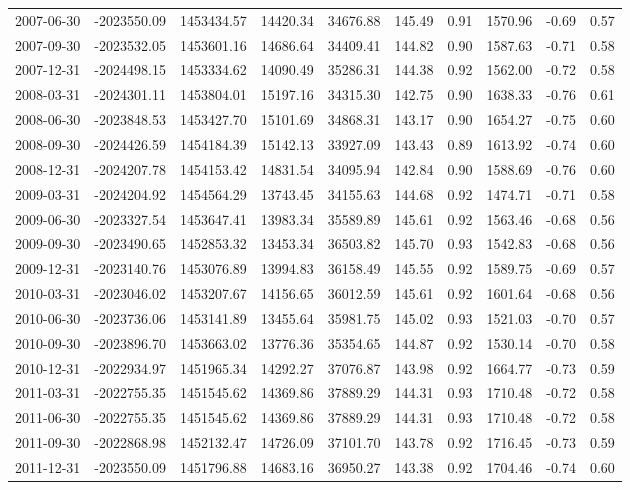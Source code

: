\begin{landscape}
\begin{longtable}{llllllllll}
2007-06-30 & -2023550.09 & 1453434.57 & 14420.34 & 34676.88 & 145.49 & 0.91 & 1570.96 & -0.69 & 0.57 \\
2007-09-30 & -2023532.05 & 1453601.16 & 14686.64 & 34409.41 & 144.82 & 0.90 & 1587.63 & -0.71 & 0.58 \\
2007-12-31 & -2024498.15 & 1453334.62 & 14090.49 & 35286.31 & 144.38 & 0.92 & 1562.00 & -0.72 & 0.58 \\
2008-03-31 & -2024301.11 & 1453804.01 & 15197.16 & 34315.30 & 142.75 & 0.90 & 1638.33 & -0.76 & 0.61 \\
2008-06-30 & -2023848.53 & 1453427.70 & 15101.69 & 34868.31 & 143.17 & 0.90 & 1654.27 & -0.75 & 0.60 \\
2008-09-30 & -2024426.59 & 1454184.39 & 15142.13 & 33927.09 & 143.43 & 0.89 & 1613.92 & -0.74 & 0.60 \\
2008-12-31 & -2024207.78 & 1454153.42 & 14831.54 & 34095.94 & 142.84 & 0.90 & 1588.69 & -0.76 & 0.60 \\
2009-03-31 & -2024204.92 & 1454564.29 & 13743.45 & 34155.63 & 144.68 & 0.92 & 1474.71 & -0.71 & 0.58 \\
2009-06-30 & -2023327.54 & 1453647.41 & 13983.34 & 35589.89 & 145.61 & 0.92 & 1563.46 & -0.68 & 0.56 \\
2009-09-30 & -2023490.65 & 1452853.32 & 13453.34 & 36503.82 & 145.70 & 0.93 & 1542.83 & -0.68 & 0.56 \\
2009-12-31 & -2023140.76 & 1453076.89 & 13994.83 & 36158.49 & 145.55 & 0.92 & 1589.75 & -0.69 & 0.57 \\
2010-03-31 & -2023046.02 & 1453207.67 & 14156.65 & 36012.59 & 145.61 & 0.92 & 1601.64 & -0.68 & 0.56 \\
2010-06-30 & -2023736.06 & 1453141.89 & 13455.64 & 35981.75 & 145.02 & 0.93 & 1521.03 & -0.70 & 0.57 \\
2010-09-30 & -2023896.70 & 1453663.02 & 13776.36 & 35354.65 & 144.87 & 0.92 & 1530.14 & -0.70 & 0.58 \\
2010-12-31 & -2022934.97 & 1451965.34 & 14292.27 & 37076.87 & 143.98 & 0.92 & 1664.77 & -0.73 & 0.59 \\
2011-03-31 & -2022755.35 & 1451545.62 & 14369.86 & 37889.29 & 144.31 & 0.93 & 1710.48 & -0.72 & 0.58 \\
2011-06-30 & -2022755.35 & 1451545.62 & 14369.86 & 37889.29 & 144.31 & 0.93 & 1710.48 & -0.72 & 0.58 \\
2011-09-30 & -2022868.98 & 1452132.47 & 14726.09 & 37101.70 & 143.78 & 0.92 & 1716.45 & -0.73 & 0.59 \\
2011-12-31 & -2023550.09 & 1451796.88 & 14683.16 & 36950.27 & 143.38 & 0.92 & 1704.46 & -0.74 & 0.60 \\

\end{longtable}
\end{landscape}
